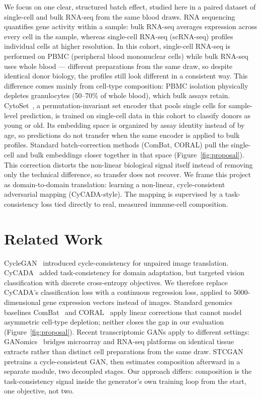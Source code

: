 We focus on one clear, structured batch effect, studied here in a paired dataset of single-cell and
bulk RNA-seq from the same blood draws. RNA sequencing quantifies gene activity within a sample:
bulk RNA-seq averages expression across every cell in the sample, whereas single-cell RNA-seq (scRNA-seq)
profiles individual cells at higher resolution. In this cohort, single-cell RNA-seq is
performed on PBMC (peripheral blood mononuclear cells) while bulk RNA-seq uses whole blood --- different
preparations from the same draw, so despite identical donor biology, the profiles still look
different in a consistent way. This difference comes mainly from cell-type
composition: PBMC isolation physically depletes
granulocytes (50--70\% of whole blood), which bulk assays retain. CytoSet~\cite{yi2021cytoset}, a
permutation-invariant set encoder that pools single cells for sample-level prediction, is trained on
single-cell data in this cohort to classify donors as young or old. Its embedding space is organized by
assay identity instead of by age, so predictions do not transfer when the same encoder is applied to
bulk profiles. Standard batch-correction methods (ComBat, CORAL) pull the single-cell and bulk
embeddings closer together in that space (Figure~\ref{fig:proposal}). This correction distorts the
non-linear biological signal itself instead of removing only the technical difference, so
transfer does not recover. We frame this project as
domain-to-domain translation: learning a non-linear, cycle-consistent adversarial mapping (CyCADA-style).
The mapping is supervised by a task-consistency loss tied directly to real, measured immune-cell
composition.

\section{Related Work}
CycleGAN~\cite{zhu2017cyclegan} introduced cycle-consistency for unpaired image translation.
CyCADA~\cite{hoffman2018cycada} added task-consistency for domain adaptation, but targeted vision
classification with discrete cross-entropy objectives. We therefore replace
CyCADA's classification loss with a continuous regression loss, applied to 5000-dimensional gene
expression vectors instead of
images. Standard
genomics baselines
ComBat~\cite{johnson2007combat} and CORAL~\cite{sun2016coral} apply linear corrections that cannot model
asymmetric cell-type depletion; neither closes the gap in our evaluation (Figure~\ref{fig:proposal}).
Recent transcriptomic
GANs apply to different settings: GANomics~\cite{wu2026ganomics} bridges microarray and RNA-seq platforms on
identical tissue extracts rather than distinct cell preparations from the same draw.
STCGAN~\cite{wang2025stcgan} pretrains a cycle-consistent GAN, then estimates composition afterward
in a separate module, two decoupled stages. Our approach differs: composition is the task-consistency
signal inside the generator's own training loop from the start, one objective, not two.

